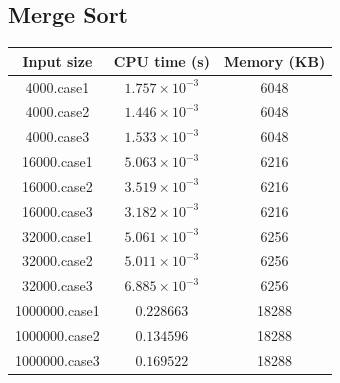 \documentclass[11pt]{article}
\theoremstyle{definition}
\begin{document}
\subsection*{Merge Sort}
\begin{center}
  \begin{tabular}{|c|c|c|}
    \hline 
    Input size & CPU time (s) & Memory (KB) \\ 
    \hline 
    4000.case1 & $1.757 \times 10^{-3}$ & 6048 \\
    \hline
    4000.case2 & $1.446 \times 10^{-3}$ & 6048 \\
    \hline
    4000.case3 & $1.533 \times 10^{-3}$ & 6048 \\
    \hline
    16000.case1 & $5.063 \times 10^{-3}$ & 6216 \\
    \hline 
    16000.case2 & $3.519 \times 10^{-3}$ & 6216 \\
    \hline
    16000.case3 & $3.182 \times 10^{-3}$ & 6216 \\
    \hline 
    32000.case1 & $5.061 \times 10^{-3}$ & 6256 \\
    \hline 
    32000.case2 & $5.011\times10^{-3}$ & 6256 \\ 
    \hline
    32000.case3 & $6.885 \times 10^{-3}$ & 6256 \\
    \hline 
    1000000.case1 & $0.228663$ & 18288 \\ 
    \hline 
    1000000.case2 & $0.134596$ & 18288 \\ 
    \hline 
    1000000.case3 & $0.169522$ & 18288 \\
    \hline
  \end{tabular}
\end{center}
\end{document}

